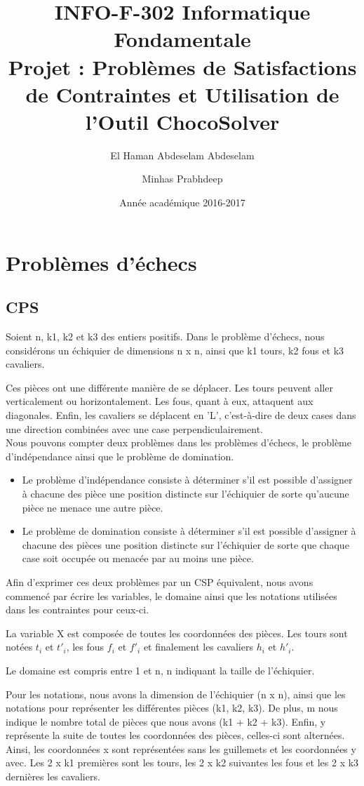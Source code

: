 \documentclass{article}
\title{INFO-F-302 Informatique Fondamentale\\ Projet : Problèmes de Satisfactions de Contraintes et Utilisation de l’Outil ChocoSolver}
\author{El Haman Abdeselam Abdeselam \and Minhas Prabhdeep}
\date{Année académique 2016-2017}
\begin{document}
\maketitle

\section{Problèmes d'échecs}

\subsection{CPS}
Soient n, k1, k2 et k3 des entiers positifs.
Dans le problème d'échecs, nous considérons un échiquier de dimensions n x n, ainsi que k1 tours, k2 fous et k3 cavaliers. 

Ces pièces ont une différente manière de se déplacer. Les tours peuvent aller verticalement ou horizontalement. Les fous, quant à eux, attaquent aux diagonales. Enfin, les cavaliers se déplacent en 'L', c’est-à-dire de deux cases dans une direction combinées avec une case perpendiculairement. \\

Nous pouvons compter deux problèmes dans les problèmes d'échecs, le problème d'indépendance ainsi que le problème de domination.
\begin{itemize}
\item Le problème d'indépendance consiste à déterminer s'il est possible d'assigner à chacune des pièce une position distincte sur l'échiquier de sorte qu'aucune pièce ne menace une autre pièce.
\item Le problème de domination consiste à déterminer s'il est possible d'assigner à chacune des pièces une position distincte sur l'échiquier de sorte que chaque case soit occupée ou menacée par au moins une pièce. \\
\end{itemize}

Afin d'exprimer ces deux problèmes par un CSP équivalent, nous avons commencé par écrire les variables, le domaine ainsi que les notations utilisées dans les contraintes pour ceux-ci.

La variable X est composée de toutes les coordonnées des pièces. Les tours sont notées $t_{i}$ et $t'_{i}$, les fous $f_{i}$ et $f'_{i}$ et finalement les cavaliers $h_{i}$ et $h'_{i}$.

Le domaine est compris entre 1 et n, n indiquant la taille de l'échiquier.

Pour les notations, nous avons la dimension de l'échiquier (n x n), ainsi que les notations pour représenter les différentes pièces (k1, k2, k3). 
De plus, m nous indique le nombre total de pièces que nous avons (k1 + k2 + k3). 
Enfin, y représente la suite de toutes les coordonnées des pièces, celles-ci sont alternées. Ainsi, les coordonnées x sont représentées sans les guillemets et les coordonnées y avec. Les 2 x k1 premières sont les tours, les 2 x k2 suivantes les fous et les 2 x k3 dernières les cavaliers.
\end{document}
